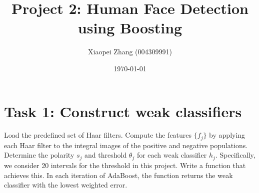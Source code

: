 \documentclass[10pt]{article}
\title{Project 2: Human Face Detection using Boosting}
\author{Xiaopei Zhang (004309991)}
\date{\today}
\begin{document}
\maketitle
\section*{\large{Task 1: Construct weak classifiers}}
	Load the predefined set of Haar filters. Compute the features $\{f_j\}$ by applying each Haar filter to the integral images of the positive and negative populations. Determine the polarity $s_j$ and threshold $\theta_j$ for each weak classifier $h_j$. Specifically, we consider 20 intervals for the threshold in this project. Write a function that achieves this. In each iteration of AdaBoost, the function returns the weak classifier with the lowest weighted error.\\ 
	
\end{document}

